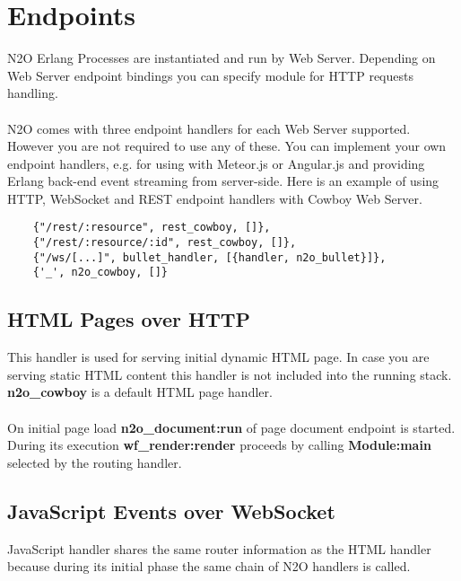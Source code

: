 \section{Endpoints}
N2O Erlang Processes are instantiated and run by Web Server.
Depending on Web Server endpoint bindings you can specify
module for HTTP requests handling.

\paragraph{}
N2O comes with three endpoint handlers for each Web Server supported.
However you are not required to use any of these.
You can implement your own endpoint handlers, e.g. for using with
Meteor.js or Angular.js and providing Erlang back-end event streaming
from server-side. Here is an example of using HTTP, WebSocket and
REST endpoint handlers with Cowboy Web Server.

\vspace{1\baselineskip}
\begin{lstlisting}
    {"/rest/:resource", rest_cowboy, []},
    {"/rest/:resource/:id", rest_cowboy, []},
    {"/ws/[...]", bullet_handler, [{handler, n2o_bullet}]},
    {'_', n2o_cowboy, []}
\end{lstlisting}

\subsection{HTML Pages over HTTP}
This handler is used for serving initial dynamic HTML page.
In case you are serving static HTML content this handler is
not included into the running stack. {\bf {n2o}\_{cowboy}} is
a default HTML page handler.

\paragraph{}
On initial page load {\bf {n2o}\_{document}:run} of page document endpoint is started.
During its execution {\bf {wf}\_{render}:render} proceeds
by calling {\bf Module:main} selected by the routing handler.

\newpage
\subsection{JavaScript Events over WebSocket}
JavaScript handler shares the same router information as the
HTML handler because during its initial phase the same chain
of N2O handlers is called.

